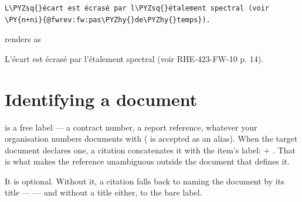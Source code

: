 \documentclass[a4paper,twoside]{article}
\begin{document}
\begin{tscode}[lang=md, engine=pygments]
\begin{Verbatim}[commandchars=\\\{\},breaklines, breakanywhere, commandchars=\\\{\}]
L\PYZsq{}écart est écrasé par l\PYZsq{}étalement spectral (voir \PY{n+ni}{@fwrev:fw:pas\PYZhy{}de\PYZhy{}temps}).
\end{Verbatim}
\end{tscode}
renders as
\begin{displayquote}
L'écart est écrasé par l'étalement spectral (voir RHE-423-FW-10 p. 14).
\end{displayquote}
\section{Identifying a document}
 is a free label --- a contract number, a report reference, whatever your
organisation numbers documents with ( is accepted as an alias). When the target document declares one,
a citation concatenates it with the item's label:  +  
\textbf{}. That is what makes the reference unambiguous outside the
document that defines it.

It is optional. Without it, a citation falls back to naming the document by its
title ---  --- and without a title either, to the
bare label.
\end{document}
